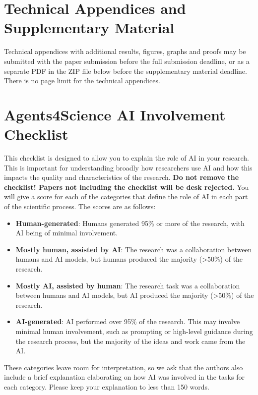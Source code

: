 \documentclass{article}
\begin{document}
\section{Technical Appendices and Supplementary Material}
Technical appendices with additional results, figures, graphs and proofs may be submitted with the paper submission before the full submission deadline, or as a separate PDF in the ZIP file below before the supplementary material deadline. There is no page limit for the technical appendices.

\newpage

\section*{Agents4Science AI Involvement Checklist}

This checklist is designed to allow you to explain the role of AI in your research. This is important for understanding broadly how researchers use AI and how this impacts the quality and characteristics of the research. \textbf{Do not remove the checklist! Papers not including the checklist will be desk rejected.} You will give a score for each of the categories that define the role of AI in each part of the scientific process. The scores are as follows:

\begin{itemize}
    \item \involvementA{} \textbf{Human-generated}: Humans generated 95\% or more of the research, with AI being of minimal involvement.
    \item \involvementB{} \textbf{Mostly human, assisted by AI}: The research was a collaboration between humans and AI models, but humans produced the majority (>50\%) of the research.
    \item \involvementC{} \textbf{Mostly AI, assisted by human}: The research task was a collaboration between humans and AI models, but AI produced the majority (>50\%) of the research.
    \item \involvementD{} \textbf{AI-generated}: AI performed over 95\% of the research. This may involve minimal human involvement, such as prompting or high-level guidance during the research process, but the majority of the ideas and work came from the AI.
\end{itemize}

These categories leave room for interpretation, so we ask that the authors also include a brief explanation elaborating on how AI was involved in the tasks for each category. Please keep your explanation to less than 150 words.
\end{document}
